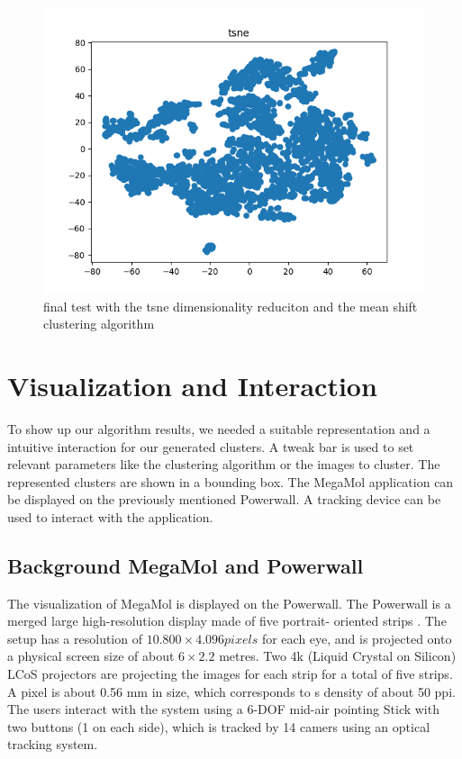 \documentclass[journal]{vgtc}       %
\begin{document}
\begin{figure}[tb]
	\begin{center}
		\includegraphics[width=.75\linewidth]{tsneFull.png}
	\end{center}
	\caption{\label{fig:tsnef} final test with the tsne dimensionality reduciton and the mean shift clustering algorithm }
\end{figure}

\section{Visualization and Interaction}

To show up our algorithm results, we needed a suitable representation and a intuitive interaction for our generated clusters. A tweak bar is used to   set relevant parameters like the clustering algorithm or the images to cluster.  The represented clusters are shown in a bounding box. The MegaMol application can be displayed on the previously mentioned Powerwall. A tracking device can be used to interact with the application.

\subsection{Background MegaMol and Powerwall}


The visualization of MegaMol is displayed on the Powerwall.
The  Powerwall is a merged large high-resolution display made of five portrait- oriented
strips . The setup has  a resolution of $10.800 \times 4.096 pixels$
for each eye, and is projected onto a physical screen size of about $6 \times 2.2$ metres. 
Two 4k (Liquid Crystal on Silicon) LCoS projectors are projecting the images for each strip for a total of five strips.
A pixel is about 0.56 mm  in size, which corresponds to s density of about 50 ppi.
The users interact with the system using a 6-DOF mid-air
pointing Stick with two buttons (1 on each side), which is tracked by 14 camers
using an optical tracking system. 
\end{document}
